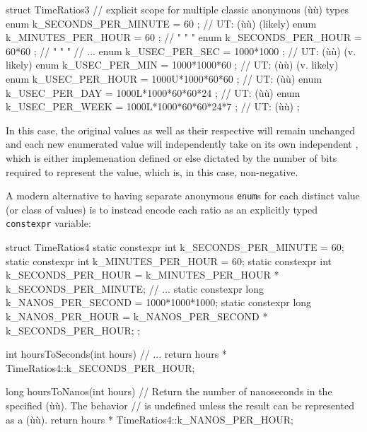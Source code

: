 \begin{emcppslisting}
struct TimeRatios3  // explicit scope for multiple classic anonymous (ù{}ù) types
{
    enum { k_SECONDS_PER_MINUTE = 60               };  // UT: (ù{}ù) (likely)
    enum { k_MINUTES_PER_HOUR   = 60               };  //  "    "      "
    enum { k_SECONDS_PER_HOUR   = 60*60            };  //  "    "      "
    // ...
    enum { k_USEC_PER_SEC  = 1000*1000             };  // UT: (ù{}ù) (v. likely)
    enum { k_USEC_PER_MIN  = 1000*1000*60          };  // UT: (ù{}ù) (v. likely)
    enum { k_USEC_PER_HOUR = 1000U*1000*60*60      };  // UT: (ù{}ù)
    enum { k_USEC_PER_DAY  = 1000L*1000*60*60*24   };  // UT: (ù{}ù)
    enum { k_USEC_PER_WEEK = 1000L*1000*60*60*24*7 };  // UT: (ù{}ù)
};
\end{emcppslisting}
    
\noindent In this case, the original values as well as their respective  will
remain unchanged and each new enumerated value will independently take
on its own independent , which is either implemenation defined or else
dictated by the number of bits required to represent the value, which
is, in this case, non-negative.

A modern alternative to having separate anonymous \lstinline!enum!s for
each distinct value (or class of values) is to instead encode each ratio
as an explicitly typed \lstinline!constexpr! variable:

\begin{emcppslisting}
struct TimeRatios4
{
    static constexpr int k_SECONDS_PER_MINUTE = 60;
    static constexpr int k_MINUTES_PER_HOUR   = 60;
    static constexpr int k_SECONDS_PER_HOUR   = k_MINUTES_PER_HOUR *
                                                k_SECONDS_PER_MINUTE;
    // ...
    static constexpr long k_NANOS_PER_SECOND  = 1000*1000*1000;
    static constexpr long k_NANOS_PER_HOUR    = k_NANOS_PER_SECOND *
                                                k_SECONDS_PER_HOUR;
};

int hoursToSeconds(int hours)
    // ...
{
    return hours * TimeRatios4::k_SECONDS_PER_HOUR;
}

long hoursToNanos(int hours)
    // Return the number of nanoseconds in the specified (ù{}ù).  The behavior
    // is undefined unless the result can be represented as a (ù{}ù).
{
    return hours * TimeRatios4::k_NANOS_PER_HOUR;
}
\end{emcppslisting}
    
